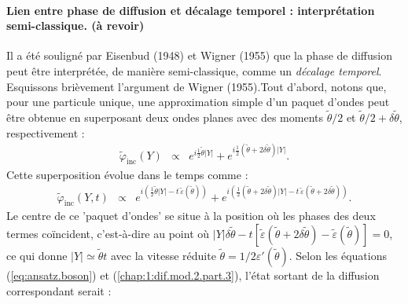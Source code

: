 \paragraph{Lien entre phase de diffusion et décalage temporel : interprétation semi-classique. {\color{red}(à revoir)}}

Il a été souligné par {\color{black}Eisenbud (1948)} et {\color{black}Wigner (1955)} que la phase de diffusion peut être interprétée, de manière semi-classique, comme un {\em décalage temporel}. Esquissons brièvement l'argument de {\color{black}Wigner (1955)}.Tout d'abord, notons que, pour une particule unique, une approximation simple d’un paquet d’ondes peut être obtenue en superposant deux ondes planes avec des moments $\tilde{\theta}/2$ et $\tilde{\theta}/2 + \delta \tilde{\theta}$, respectivement :
\begin{eqnarray}
	\tilde{\varphi}_{\text{inc}}(Y) & \propto & e^{i\frac{1}{2}\tilde{\theta} \vert Y\vert} + e^{i\frac{1}{2}\left(\tilde{\theta} + 2\delta \tilde{\theta} \right) \vert Y\vert}.
\end{eqnarray}
Cette superposition évolue dans le temps comme :
\begin{eqnarray}
\tilde{\varphi}_{\text{inc}}(Y, t) &\propto &  e^{i\left( \frac{1}{2} \tilde{\theta}\vert Y\vert - t\,\tilde{\varepsilon}(\tilde{\theta}) \right)} + e^{i\left( \frac{1}{2}\left(  \tilde{\theta} + 2\delta \tilde{\theta} \right) \vert Y\vert - t\,\tilde{\varepsilon}(\tilde{\theta} + 2\delta \tilde{\theta}) \right)}.
\end{eqnarray}
Le centre de ce 'paquet d'ondes' se situe à la position où les phases des deux termes coïncident, c'est-à-dire au point où $\vert Y\vert\delta \tilde{\theta}  - t[\tilde{\varepsilon}(\tilde{\theta} + 2\delta \tilde{\theta} ) - \tilde{\varepsilon}(\tilde{\theta})] = 0$, ce qui donne $\vert Y\vert \simeq \tilde{\theta} t$ avec la vitesse réduite $\tilde{\theta} = 1/2 \varepsilon'(\tilde{\theta}) $. %
Selon les équations (\ref{eq:ansatz.boson}) et (\ref{chap:1:dif.mod.2.part.3}), l'état sortant de la diffusion correspondant serait :
